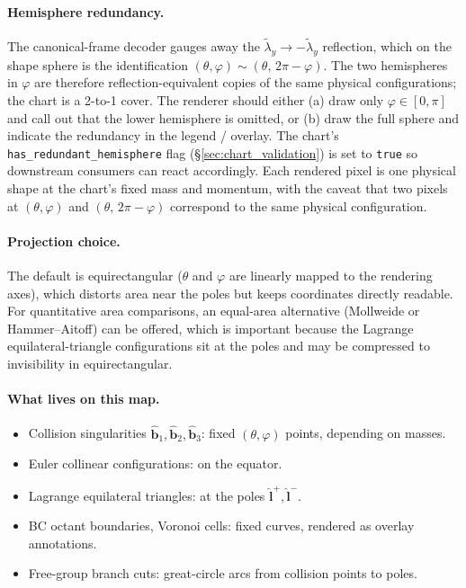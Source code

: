 \documentclass[11pt]{report}
\begin{document}
\paragraph{Hemisphere redundancy.} The canonical-frame decoder gauges away the $\tilde\lambda_y\to-\tilde\lambda_y$ reflection, which on the shape sphere is the identification $(\theta,\varphi)\sim(\theta,\,2\pi-\varphi)$. The two hemispheres in $\varphi$ are therefore reflection-equivalent copies of the same physical configurations; the chart is a 2-to-1 cover. The renderer should either (a) draw only $\varphi\in[0,\pi]$ and call out that the lower hemisphere is omitted, or (b) draw the full sphere and indicate the redundancy in the legend / overlay. The chart's \texttt{has\_redundant\_hemisphere} flag (\S\ref{sec:chart_validation}) is set to \texttt{true} so downstream consumers can react accordingly. Each rendered pixel is one physical shape at the chart's fixed mass and momentum, with the caveat that two pixels at $(\theta,\varphi)$ and $(\theta,\,2\pi-\varphi)$ correspond to the same physical configuration.

\paragraph{Projection choice.} The default is equirectangular ($\theta$ and $\varphi$ are linearly mapped to the rendering axes), which distorts area near the poles but keeps coordinates directly readable. For quantitative area comparisons, an equal-area alternative (Mollweide or Hammer--Aitoff) can be offered, which is important because the Lagrange equilateral-triangle configurations sit at the poles and may be compressed to invisibility in equirectangular.

\paragraph{What lives on this map.}
\begin{itemize}[nosep]
\item Collision singularities $\hat{\mathbf b}_1,\hat{\mathbf b}_2,\hat{\mathbf b}_3$: fixed $(\theta,\varphi)$ points, depending on masses.
\item Euler collinear configurations: on the equator.
\item Lagrange equilateral triangles: at the poles $\hat{\mathbf l}^+,\hat{\mathbf l}^-$.
\item BC octant boundaries, Voronoi cells: fixed curves, rendered as overlay annotations.
\item Free-group branch cuts: great-circle arcs from collision points to poles.
\end{itemize}
\end{document}
